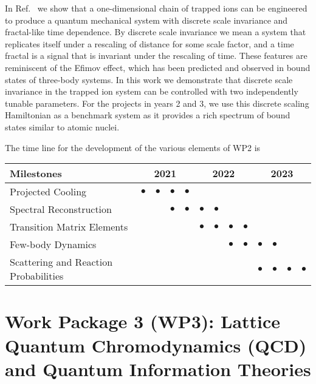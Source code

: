 \documentclass[11pt]{article}
\begin{document}
In Ref.~\cite{Lee:2019gtc} we show that a one-dimensional chain of trapped ions can be engineered to produce a quantum mechanical system with discrete scale invariance and fractal-like time dependence. By discrete scale invariance we mean a system that replicates itself under a rescaling of distance for some scale factor, and a time fractal is a signal that is invariant under the rescaling of time. These features are reminiscent of the Efimov effect, which has been predicted and observed in bound states of three-body systems. In this work we demonstrate that discrete scale invariance in the trapped ion system can be controlled with two independently tunable parameters.  For the projects in years 2 
and 3, we use this discrete scaling Hamiltonian as a benchmark system as it provides a rich spectrum of bound states similar to atomic nuclei.   


 The time line for the development of the various elements of WP2 is
\begin{footnotesize}
\begin{center}
\begin{tabular}{|l|c|c|c|c|c|c|c|c|c|c|c|c|}
\hline
\multicolumn{1}{|l}{Milestones } & \multicolumn{4}{|c|}{ 2021 } & \multicolumn{4}{c|}{ 2022 } & \multicolumn{4}{c|}{ 2023 } \\
\hline
Projected Cooling &$\bullet$ &$\bullet$ &$\bullet$ &$\bullet$ & & & & & & & &  \\
\hline
Spectral Reconstruction & & & $\bullet$ &$\bullet$ &$\bullet$ &$\bullet$ & & & & & &  \\
\hline
Transition Matrix Elements & & & & & $\bullet$ &$\bullet$ &$\bullet$ &$\bullet$ & & & &   \\
\hline
Few-body Dynamics & & & & & & & $\bullet$ &$\bullet$ &$\bullet$ &$\bullet$ & &\\
\hline
Scattering and Reaction Probabilities & & & & & & & & & $\bullet$ &$\bullet$ &$\bullet$ &$\bullet$ \\
\hline

\end{tabular}
\end{center}
\end{footnotesize}

\section{Work Package 3 (WP3): Lattice Quantum Chromodynamics (QCD) and Quantum Information Theories}
\end{document}
